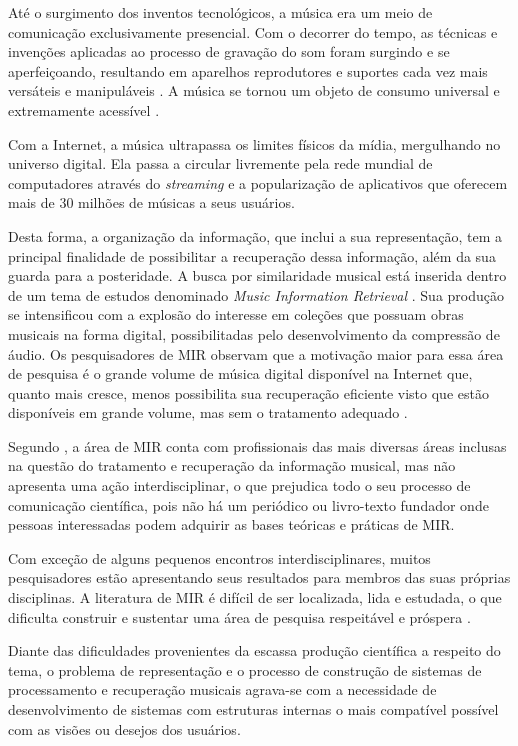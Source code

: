 Até o surgimento dos inventos tecnológicos, a música era um meio de comunicação exclusivamente presencial. Com o decorrer do tempo, as técnicas e invenções aplicadas ao processo de gravação do som foram surgindo e se aperfeiçoando, resultando em aparelhos reprodutores e suportes cada vez mais versáteis e manipuláveis \cite{daquino2012}. A música se tornou um objeto de consumo universal e extremamente acessível \cite{gomes2015}.

Com a Internet, a música ultrapassa os limites físicos da mídia, mergulhando no universo digital. Ela passa a circular livremente pela rede mundial de computadores através do \textit{streaming} \cite{junior&segundo2008} e a popularização de aplicativos que oferecem mais de 30 milhões de músicas a seus usuários.

Desta forma, a organização da informação, que inclui a sua representação, tem a principal finalidade de possibilitar a recuperação dessa informação, além da sua guarda para a posteridade. A busca por similaridade musical está inserida dentro de um tema de estudos denominado \textit{Music Information Retrieval} \cite{mclane1996}. Sua produção se intensificou com a explosão do interesse em coleções que possuam obras musicais na forma digital, possibilitadas pelo desenvolvimento da compressão de áudio. Os pesquisadores de MIR observam que a motivação maior para essa área de pesquisa é o grande volume de música digital disponível na Internet que, quanto mais cresce, menos possibilita sua recuperação eficiente visto que estão disponíveis em grande volume, mas sem o tratamento adequado \cite{gomes2015}.

Segundo , a área de MIR conta com profissionais das mais diversas áreas inclusas na questão do tratamento e recuperação da informação musical, mas não apresenta uma ação interdisciplinar, o que prejudica todo o seu processo de comunicação científica, pois não há um periódico ou livro-texto fundador onde pessoas interessadas podem adquirir as bases teóricas e práticas de MIR. 

Com exceção de alguns pequenos encontros interdisciplinares, muitos pesquisadores estão apresentando seus resultados para membros das suas próprias disciplinas. A literatura de MIR é difícil de ser localizada, lida e estudada, o que dificulta construir e sustentar uma área de pesquisa respeitável e próspera \cite{santini&souza2007}.

Diante das dificuldades provenientes da escassa produção científica a respeito do tema, o problema de representação e o processo de construção de sistemas de processamento e recuperação musicais agrava-se com a necessidade de desenvolvimento de sistemas com estruturas internas o mais compatível possível com as visões ou desejos dos usuários.


